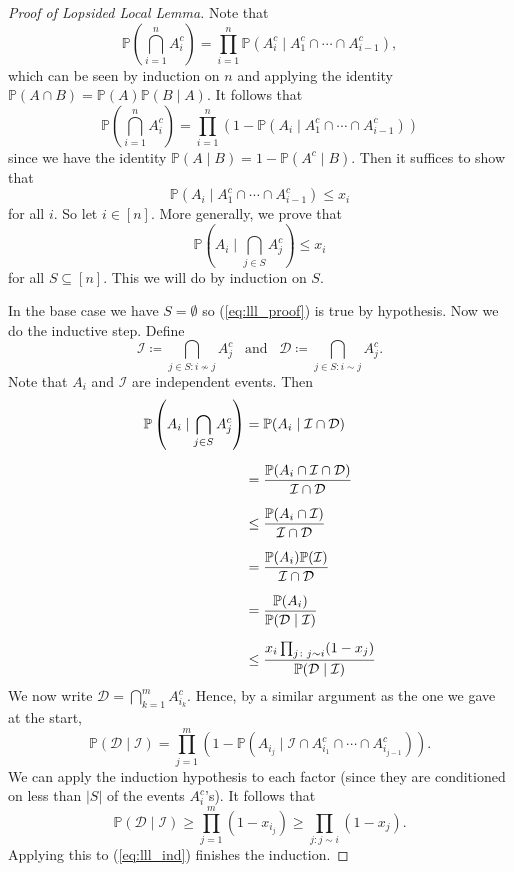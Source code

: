 \documentclass{report}
\theoremstyle{definition}
\theoremstyle{plain}
\theoremstyle{definition}
\begin{document}
	\begin{proof}[Proof of Lopsided Local Lemma]
		Note that
		\[
			\mathbb{P}\left(\bigcap_{i=1}^n A_{i}^c\right) = \prod_{i = 1}^{n}\mathbb{P}(A_i^c \mid A_1^c\cap\cdots\cap A_{i-1}^c),
		\]
		which can be seen by induction on $n$ and applying the identity $\mathbb{P}(A\cap B) = \mathbb{P}(A)\mathbb{P}(B \mid A)$. It follows that
		\[
			\mathbb{P}\left(\bigcap_{i=1}^n A_{i}^c\right) = \prod_{i = 1}^{n} \left(1- \mathbb{P}(A_i \mid A_1^c\cap\cdots\cap A_{i-1}^c)\right)
		\]
		since we have the identity $\mathbb{P}(A \mid B) = 1 - \mathbb{P}(A^c \mid B)$. Then it suffices to show that 
		\[
			\mathbb{P}(A_i \mid A_1^c \cap \cdots \cap A_{i-1}^c) \leq x_i
		\]
		for all $i$. So let $i\in [n]$. More generally, we prove that 
		\begin{equation}\label{eq:lll_proof}
			\mathbb{P}\left(A_i \mid \bigcap_{j\in S}A_j^c\right) \leq x_i
		\end{equation}
		for all $S\subseteq [n]$. This we will do by induction on $S$. 
		
		In the base case we have $S = \emptyset$ so (\ref{eq:lll_proof}) is true by hypothesis. Now we do the inductive step. Define
		\[
			\mathcal{I} \coloneqq \bigcap_{j\in S \colon i \nsim j} A_j^c \,\,\,\text{ and }\,\,\, \mathcal{D}\coloneqq \bigcap_{j\in S\colon i\sim j}A_j^c.
		\]
		Note that $A_i$ and $\mathcal{I}$ are independent events. Then
		\begin{align}
			\mathbb{P}\left(A_i \mid \bigcap_{j\in S}A_j^c\right) &= \mathbb{P}(A_i \mid \mathcal{I}\cap \mathcal{D})\notag\\[6pt]
			&= \frac{\mathbb{P}(A_i \cap \mathcal{I}\cap\mathcal{D})}{\mathcal{I}\cap\mathcal{D}}\notag\\[6pt]
			&\leq \frac{\mathbb{P}(A_i \cap \mathcal{I})}{\mathcal{I}\cap\mathcal{D}}\notag\\[6pt]
			&= \frac{\mathbb{P}(A_i) \mathbb{P}(\mathcal{I})}{\mathcal{I}\cap\mathcal{D}}\notag\\[6pt]
			&= \frac{\mathbb{P}(A_i)}{\mathbb{P}(\mathcal{D}\mid \mathcal{I})}\notag\\[6pt]
			&\leq \frac{x_i \prod_{j\colon j \sim i}(1-x_j)}{\mathbb{P}(\mathcal{D}\mid \mathcal{I})}\label{eq:lll_ind}		
		\end{align}
		We now write $\mathcal{D} = \bigcap_{k=1}^mA_{i_k}^c$. Hence, by a similar argument as the one we gave at the start,
		\[
			\mathbb{P}(\mathcal{D}\mid\mathcal{I}) = \prod_{j = 1}^{m} \left(1 - \mathbb{P}(A_{i_j} \mid \mathcal{I}\cap A_{i_1}^c\cap \cdots \cap A_{i_{j-1}}^c)\right).
		\]
		We can apply the induction hypothesis to each factor (since they are conditioned on less than $|S|$ of the events $A_{i}^c$'s). It follows that
		\[
			\mathbb{P}(\mathcal{D}\mid\mathcal{I}) \geq \prod_{j = 1}^{m}(1-x_{i_j}) \geq \prod_{j\colon j \sim i }(1 - x_j).
		\]
		Applying this to (\ref{eq:lll_ind}) finishes the induction.
	\end{proof}
\end{document}
